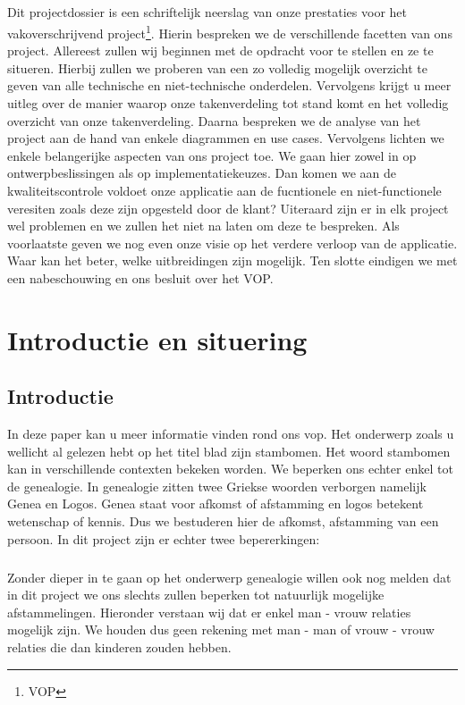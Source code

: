 \documentclass[pdftex,a4paper,12pt,twoside]{report}
\begin{document}
\paragraph{}
Dit projectdossier is een schriftelijk neerslag van onze prestaties voor het vakoverschrijvend project\footnote{VOP}. Hierin bespreken we de verschillende facetten van ons project. 
Allereest zullen wij beginnen met de opdracht voor te stellen en ze te situeren. Hierbij zullen we proberen van een zo volledig mogelijk overzicht te geven van alle technische en niet-technische onderdelen. Vervolgens krijgt u meer uitleg over de manier waarop onze takenverdeling tot stand komt en het volledig overzicht van onze takenverdeling.
Daarna bespreken we de analyse van het project aan de hand van enkele diagrammen en use cases. Vervolgens lichten we enkele belangerijke aspecten van ons project toe. We gaan hier zowel in op ontwerpbeslissingen als op implementatiekeuzes. Dan komen we aan de kwaliteitscontrole voldoet onze applicatie aan de fucntionele en niet-functionele veresiten zoals deze zijn opgesteld door de klant? Uiteraard zijn er in elk project wel problemen en we zullen het niet na laten om deze te bespreken. Als voorlaatste geven we nog even onze visie op het verdere verloop van de applicatie. Waar kan het beter, welke uitbreidingen zijn mogelijk. Ten slotte eindigen we met een nabeschouwing en ons besluit over het VOP.
\chapter{Introductie en situering}\label{ch:introduction}

\section{Introductie}
In deze paper kan u meer informatie vinden rond ons vop. Het onderwerp zoals u wellicht al gelezen hebt op het titel blad zijn stambomen. Het woord stambomen kan in verschillende contexten bekeken worden. We beperken ons echter enkel tot de genealogie. In genealogie zitten twee Griekse woorden verborgen namelijk Genea en Logos. Genea staat voor afkomst of afstamming en logos betekent wetenschap of kennis. 
Dus we bestuderen hier de afkomst, afstamming van een persoon.
In dit project zijn er echter twee bepererkingen:
\paragraph{}
Zonder dieper in te gaan op het onderwerp genealogie willen ook nog melden dat in dit project we ons slechts zullen beperken tot natuurlijk mogelijke afstammelingen. Hieronder verstaan wij dat er enkel man - vrouw relaties mogelijk zijn. We houden dus geen rekening met man - man of vrouw - vrouw relaties die dan kinderen zouden hebben.
\end{document}
